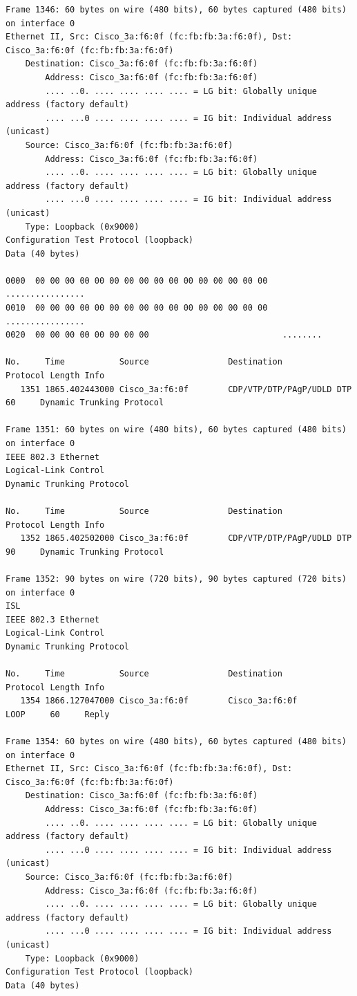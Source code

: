 \documentclass[a4paper,11pt]{article}
\begin{document}
\begin{lstlisting}
Frame 1346: 60 bytes on wire (480 bits), 60 bytes captured (480 bits) on interface 0
Ethernet II, Src: Cisco_3a:f6:0f (fc:fb:fb:3a:f6:0f), Dst: Cisco_3a:f6:0f (fc:fb:fb:3a:f6:0f)
    Destination: Cisco_3a:f6:0f (fc:fb:fb:3a:f6:0f)
        Address: Cisco_3a:f6:0f (fc:fb:fb:3a:f6:0f)
        .... ..0. .... .... .... .... = LG bit: Globally unique address (factory default)
        .... ...0 .... .... .... .... = IG bit: Individual address (unicast)
    Source: Cisco_3a:f6:0f (fc:fb:fb:3a:f6:0f)
        Address: Cisco_3a:f6:0f (fc:fb:fb:3a:f6:0f)
        .... ..0. .... .... .... .... = LG bit: Globally unique address (factory default)
        .... ...0 .... .... .... .... = IG bit: Individual address (unicast)
    Type: Loopback (0x9000)
Configuration Test Protocol (loopback)
Data (40 bytes)

0000  00 00 00 00 00 00 00 00 00 00 00 00 00 00 00 00   ................
0010  00 00 00 00 00 00 00 00 00 00 00 00 00 00 00 00   ................
0020  00 00 00 00 00 00 00 00                           ........

No.     Time           Source                Destination           Protocol Length Info
   1351 1865.402443000 Cisco_3a:f6:0f        CDP/VTP/DTP/PAgP/UDLD DTP      60     Dynamic Trunking Protocol

Frame 1351: 60 bytes on wire (480 bits), 60 bytes captured (480 bits) on interface 0
IEEE 802.3 Ethernet 
Logical-Link Control
Dynamic Trunking Protocol

No.     Time           Source                Destination           Protocol Length Info
   1352 1865.402502000 Cisco_3a:f6:0f        CDP/VTP/DTP/PAgP/UDLD DTP      90     Dynamic Trunking Protocol

Frame 1352: 90 bytes on wire (720 bits), 90 bytes captured (720 bits) on interface 0
ISL
IEEE 802.3 Ethernet 
Logical-Link Control
Dynamic Trunking Protocol

No.     Time           Source                Destination           Protocol Length Info
   1354 1866.127047000 Cisco_3a:f6:0f        Cisco_3a:f6:0f        LOOP     60     Reply

Frame 1354: 60 bytes on wire (480 bits), 60 bytes captured (480 bits) on interface 0
Ethernet II, Src: Cisco_3a:f6:0f (fc:fb:fb:3a:f6:0f), Dst: Cisco_3a:f6:0f (fc:fb:fb:3a:f6:0f)
    Destination: Cisco_3a:f6:0f (fc:fb:fb:3a:f6:0f)
        Address: Cisco_3a:f6:0f (fc:fb:fb:3a:f6:0f)
        .... ..0. .... .... .... .... = LG bit: Globally unique address (factory default)
        .... ...0 .... .... .... .... = IG bit: Individual address (unicast)
    Source: Cisco_3a:f6:0f (fc:fb:fb:3a:f6:0f)
        Address: Cisco_3a:f6:0f (fc:fb:fb:3a:f6:0f)
        .... ..0. .... .... .... .... = LG bit: Globally unique address (factory default)
        .... ...0 .... .... .... .... = IG bit: Individual address (unicast)
    Type: Loopback (0x9000)
Configuration Test Protocol (loopback)
Data (40 bytes)


\end{lstlisting}
\end{document}
